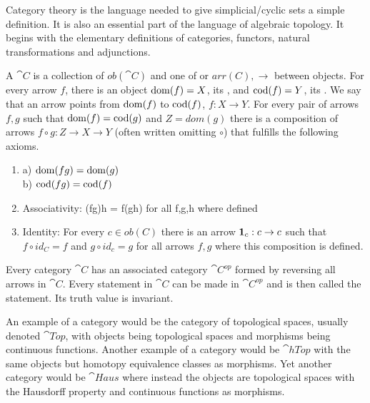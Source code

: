 \documentclass[../../main.tex]{subfiles}
\begin{document}
    Category theory is the language needed to give simplicial/cyclic sets a simple definition. It is also an essential part of the language of algebraic topology. It begins with the elementary definitions of categories, functors, natural transformations and adjunctions.
        
    \begin{definition}
        A  $\cat{C}$ is a collection of  $ob(\cat{C})$ and one of  or  $arr(C), \to$ between objects. For every arrow $f$, there is an object $\domain{f} = X$, its , and $\codomain{f} = Y$, its . We say that an arrow points from $\domain{f}$ to $\codomain{f}$, $f:X\to Y$. For every pair of arrows $f, g$ such that $\domain{f} = \codomain{g}$ and $Z = dom(g)$ there is a composition of arrows $f \circ g:Z\to X\to Y$ (often written omitting $\circ$) that fulfills the following axioms.
        
        \begin{enumerate}
            \item a) $\domain{fg} = \domain{g}$ \\
                b) $\codomain{fg} = \codomain{f}$
            \item Associativity: (fg)h = f(gh) for all f,g,h where defined
            \item Identity: For every $c \in ob(C)$ there is an arrow $\idarrow[c]: c \to c$ such that $f \circ id_C = f$ and $g \circ id_c = g$ for all arrows $f, g$ where this composition is defined.
        \end{enumerate}
    \end{definition}
    
    Every category $\cat{C}$ has an associated category $\cat{C^{op}}$ formed by reversing all arrows in $\cat{C}$. Every statement in $\cat{C}$ can be made in $\cat{C^{op}}$ and is then called the  statement. Its truth value is invariant.

    \begin{example}
        An example of a category would be the category of topological spaces, usually denoted $\cat{Top}$, with objects being topological spaces and morphisms being continuous functions. Another example of a category would be $\cat{hTop}$ with the same objects but homotopy equivalence classes as morphisms. Yet another category would be $\cat{Haus}$ where instead the objects are topological spaces with the Hausdorff property and continuous functions as morphisms.
    \end{example}
\end{document}
